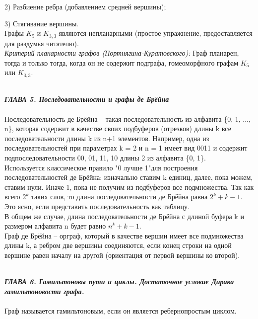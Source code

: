 \documentclass[12pt]{article}
\begin{document}
2) Разбиение ребра (добавлением средней вершины);

3) Стягивание вершины.\\

Графы \(K_{5}\) и \(K_{3,3}\) являются непланарными (простое упражнение, предоставляется для раздумья читателю).\\

\textit{Критерий планарности графов (Портнягина-Куратовского):} Граф планарен, тогда и только тогда, когда он не содержит подграфа, гомеоморфного графам \(K_{5}\) или \(K_{3,3}\).

\newpage
\\
\textbf{\textit{ГЛАВА 5. Последовательности и графы де Брёйна}}
\\
\\

Последовательность де Брёйна -- такая последовательность из алфавита \{0, 1, ..., n\}, которая содержит в качестве своих подбуферов (отрезков) длины k все последовательности длины k из n+1 элементов. Например, одна из последовательностей при параметрах k = 2 и n = 1 имеет вид 0011 и содержит подпоследовательности 00, 01, 11, 10 длины 2 из алфавита \{0, 1\}. \\

Используется классическое правило "0 лучше 1"\;для построения последовательностей де Брёйна: изначально ставим k единиц, далее, пока можем, ставим нули. Иначе 1, пока не получим из подбуферов все подмножества. Так как всего \(2^k\) таких слов, то длина последовательности де Брёйна равна \(2^k + k - 1\). Это ясно, если представить последовательность как таблицу. \\

В общем же случае, длина последовательности де Брёйна с длиной буфера k и размером алфавита n будет равно \(\mathit{n^k + k  - 1}\).\\

Граф де Брёйна -- орграф, который в качестве вершин имеет все подмножества длины k, а ребром две вершины соединяются, если конец строки на одной вершине равен началу на другой (ориентация от первой вершины ко второй).  

\newpage
\\
\textbf{\textit{ГЛАВА 6. Гамильтоновы пути и циклы. Достаточное условие Дирака гамильтоновости графа.}}
\\
\\

Граф называется гамильтоновым, если он является ребернопростым циклом.\\
\end{document}
